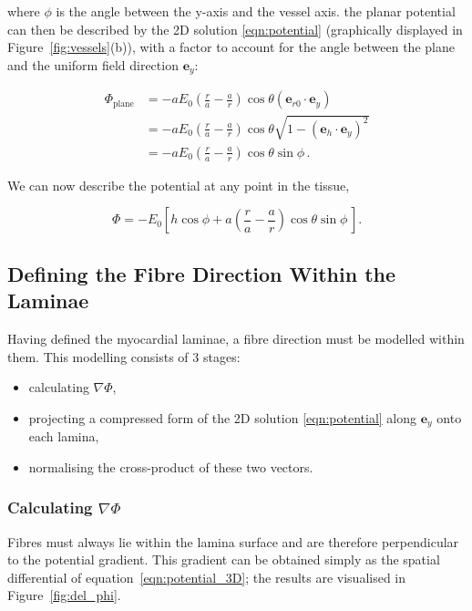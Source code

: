   where $\phi$ is the angle between the y-axis and the vessel axis. the planar potential can then be described by the 2D solution \ref{eqn:potential} (graphically displayed in Figure~\ref{fig:vessels}(b)), with a factor to account for the angle between the plane and the uniform field direction $\mathbf{e}_y$:
  
  \begin{align}
    \Phi_{\text{plane}} &= -aE_0\left( \frac{r}{a} - \frac{a}{r} \right) \cos \theta \left(\mathbf{e}_{r0} \cdot \mathbf{e}_y \right) \\
    &= -aE_0\left( \frac{r}{a} - \frac{a}{r} \right) \cos \theta \sqrt{ 1 - \left( \mathbf{e}_h \cdot \mathbf{e}_y \right)^2 } \\
    &= -aE_0\left( \frac{r}{a} - \frac{a}{r} \right) \cos \theta \sin \phi \, .
  \end{align}
  
  We can now describe the potential at any point in the tissue,
  
  \begin{equation}
    \Phi = -E_0\left[ h \cos \phi + a \left( \frac{r}{a} - \frac{a}{r} \right) \cos \theta \sin \phi \, \right].
    \label{eqn:potential_3D}
  \end{equation}
  

\subsection{Defining the Fibre Direction Within the Laminae}
\label{sec:defining_the_fibre_direction_within_the_laminae}
  Having defined the myocardial laminae, a fibre direction must be modelled within them. This modelling consists of 3 stages:
  
  \begin{itemize}
    \item calculating $\nabla\Phi$,
    \item projecting a compressed form of the 2D solution \ref{eqn:potential} along $\mathbf{e}_y$ onto each lamina,
    \item normalising the cross-product of these two vectors.
  \end{itemize}
  
  \subsubsection{Calculating $\nabla\Phi$}
  \label{sub:calculating_nablaphi}
    Fibres must always lie within the lamina surface and are therefore perpendicular to the potential gradient. This gradient can be obtained simply as the spatial differential of equation~\ref{eqn:potential_3D}; the results are visualised in Figure~\ref{fig:del_phi}.
    
